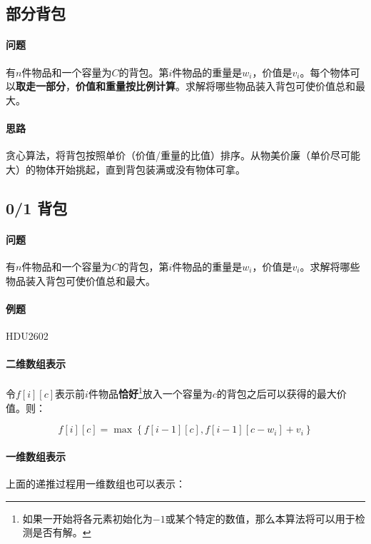 \subsection{部分背包}

\paragraph{问题} 有$n$件物品和一个容量为$C$的背包。第$i$件物品的重量是$w_i$，价值是$v_i$。每个物体可以\textbf{取走一部分}，\textbf{价值和重量按比例计算}。求解将哪些物品装入背包可使价值总和最大。

\paragraph{思路} 贪心算法，将背包按照单价（价值/重量的比值）排序。从物美价廉（单价尽可能大）的物体开始挑起，直到背包装满或没有物体可拿。

\subsection{0/1 背包}

\paragraph{问题} 有$n$件物品和一个容量为$C$的背包，第$i$件物品的重量是$w_i$，价值是$v_i$。求解将哪些物品装入背包可使价值总和最大。

\paragraph{例题} HDU2602

\paragraph{二维数组表示} 令$f[i][c]$表示前$i$件物品\textbf{恰好}\footnote{如果一开始将各元素初始化为$-1$或某个特定的数值，那么本算法将可以用于检测是否有解。}放入一个容量为$c$的背包之后可以获得的最大价值。则：

\begin{equation}
  f[i][c]=\max\left\{f[i-1][c], f[i-1][c-w_i]+v_i\right\}
\end{equation}



\paragraph{一维数组表示} 上面的递推过程用一维数组也可以表示：

